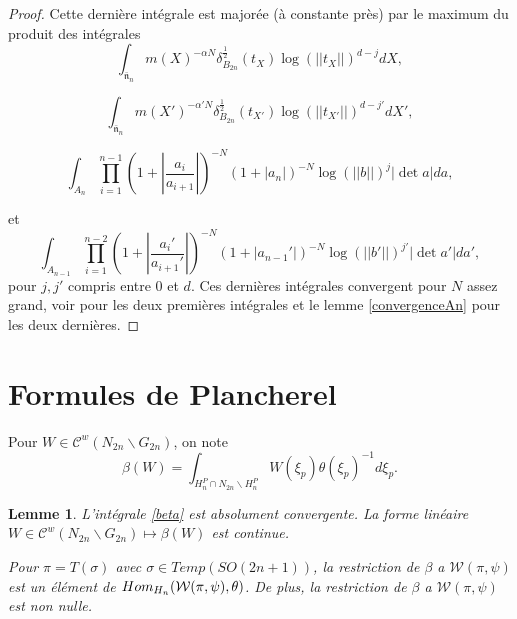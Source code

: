 \documentclass{amsart}
\newtheorem{lemme}{Lemme}[section]
\DeclareMathOperator{\Hom}{\mathnormal{Hom}}
\begin{document}
\begin{proof}
Cette dernière intégrale est majorée (à constante près) par le maximum du produit des intégrales
 \begin{equation}
 \int_{\bar{\mathfrak{n}}_n} m(X)^{-\alpha N} \delta^{\frac{1}{2}}_{B_{2n}}(t_X)\log(||t_X||)^{d-j} dX,
 \end{equation}
 
 \begin{equation}
 \int_{\bar{\mathfrak{n}}_n} m(X')^{-\alpha' N} \delta^{\frac{1}{2}}_{B_{2n}}(t_{X'})\log(||t_{X'}||)^{d-j'} dX',
 \end{equation}
 
 \begin{equation}
 \int_{A_n}  \prod_{i=1}^{n-1} (1+ |\frac{a_i}{a_{i+1}}|)^{-N} (1+|a_n|)^{-N}\log(||b||)^j|\det a| da,
 \end{equation}
 
 et
 \begin{equation}
 \int_{A_{n-1}}  \prod_{i=1}^{n-2} (1+ |\frac{a_i'}{a_{i+1}'}|)^{-N} (1+|a_{n-1}'|)^{-N}\log(||b'||)^{j'}|\det a'|da',
 \end{equation}
 pour $j, j'$ compris entre $0$ et $d$. Ces dernières intégrales convergent pour $N$ assez grand, voir \cite[proposition 5.5]{jacquet-shalika} pour les deux premières intégrales et le lemme \ref{convergenceAn} pour les deux dernières.

 \end{proof}
 
 
 \section{Formules de Plancherel}
 
 \label{plancherel}
 Pour $W \in \mathcal{C}^w(N_{2n} \backslash G_{2n})$, on note
\begin{equation}
\label{beta}
\beta(W) = \int_{H^P_n \cap N_{2n} \backslash H^P_n} W(\xi_p) \theta(\xi_p)^{-1} d\xi_p.
\end{equation}

\begin{lemme}
\label{lemmebeta}
L'intégrale \ref{beta} est absolument convergente. La forme linéaire $W \in \mathcal{C}^w(N_{2n} \backslash G_{2n}) \mapsto \beta(W)$ est continue.

Pour $\pi = T(\sigma)$ avec $\sigma \in Temp(SO(2n+1))$, la restriction de $\beta$ a $\mathcal{W}(\pi, \psi)$ est un élément de $\Hom_{H_n}(\mathcal{W}(\pi, \psi), \theta)$. De plus, la restriction de $\beta$ a $\mathcal{W}(\pi, \psi)$ est non nulle.
\end{lemme}
\end{document}
